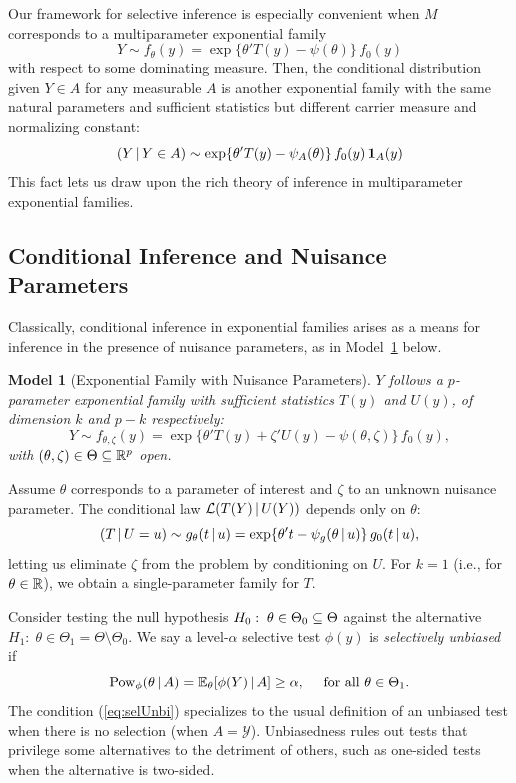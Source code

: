 \documentclass{article}
\newtheorem{model}[theorem]{Model}
\theoremstyle{definition}
\newcommand{\cY}{\mathcal{Y}}
\newcommand{\pow}{\text{Pow}}
\newcommand{\cL}{\mathcal{L}}
\begin{document}
Our framework for selective inference is especially convenient when $M$ corresponds to a multiparameter exponential family
\begin{equation}\label{eq:exfam}
  Y \sim f_{\theta}(y) = \exp\{\theta'T(y) - \psi(\theta)\}\, f_0(y)
\end{equation}
with respect to some dominating measure. Then, the conditional distribution given $Y\in A$ for any measurable $A$ is another exponential family with the same natural parameters and sufficient statistics but different carrier measure and normalizing constant:
\begin{equation}
  (Y\,|\, Y\in A) \sim \exp\{\theta'T(y) -  \psi_A(\theta)\}\,
  f_0(y)\, \mathbf{1}_A(y)
\end{equation}
This fact lets us draw upon the rich theory of inference in
multiparameter exponential families.

\subsection{Conditional Inference and Nuisance Parameters}\label{sec:condInf}
Classically, conditional inference in exponential families arises as a means for inference in the presence of nuisance parameters, as in Model~\ref{mod:partExFam} below.

\begin{model}[Exponential Family with Nuisance Parameters]\label{mod:partExFam}
$Y$ follows a $p$-parameter exponential family with sufficient statistics $T(y)$ and $U(y)$, of dimension $k$ and $p-k$ respectively:
\begin{equation}\label{eq:partExFam}
  Y\sim f_{\theta,\zeta}(y)
  = \exp\{\theta'T(y) + \zeta 'U(y) - \psi(\theta, \zeta)\}\, f_{0}(y),
\end{equation}
with $(\theta,\zeta)\in \Theta\subseteq \mathbb{R}^{p}$ open.
\end{model}

Assume $\theta$ corresponds to a parameter of interest and $\zeta$ to an unknown nuisance parameter.
The conditional law $\cL(T(Y) \gv U(Y))$ depends only on $\theta$:
\begin{equation}\label{eq:efCond}
  \left(T\,|\, U=u\right) \sim g_{\theta}(t \,|\, u) = \exp\{\theta't -
    \psi_g(\theta\,|\, u)\}\, g_0(t\,|\, u),
\end{equation}
letting us eliminate $\zeta$ from the problem by conditioning on $U$. For $k=1$ (i.e., for $\theta\in \mathbb{R}$), we obtain a single-parameter family for $T$.

Consider testing the null hypothesis $H_0:\; \theta \in \Theta_0 \subseteq \Theta$ against the alternative $H_1:\; \theta \in \Theta_1 = \Theta\setminus \Theta_0$. We say a level-$\alpha$ selective test $\phi(y)$ is {\em selectively unbiased} if
\begin{equation}\label{eq:selUnbi}
  \pow_\phi(\theta \gv A) = \E_{\theta}[\phi(Y) \gv A] \geq \alpha, \quad \text{ for all }\theta\in \Theta_1.
\end{equation}
The condition (\ref{eq:selUnbi}) specializes to the usual definition of an unbiased test when there is no selection (when $A=\cY$). Unbiasedness rules out tests that privilege some alternatives to the detriment of others, such as one-sided tests when the alternative is two-sided.
\end{document}
